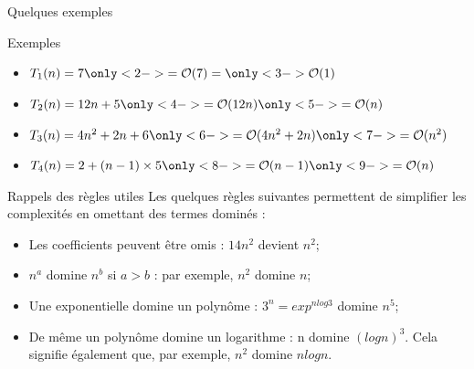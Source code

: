 \documentclass[10pt,xcolor=dvipsnames]{beamer}
\begin{document}
\begin{frame}{Quelques exemples}
    \begin{exampleblock}{Exemples}
\begin{itemize}
    \item $T_1(n) = 7 \only<2->{= \mathcal{O}(7)} = \only<3->{\mathcal{O}(1)}$
    \item $T_2(n) = 12n + 5 \only<4->{= \mathcal{O}(12n)} \only<5->{= \mathcal{O}(n)}$
    \item $T_3(n) = 4n^2 + 2n + 6 \only<6->{= \mathcal{O}(4n^2 + 2n)} \only<7->{= \mathcal{O}(n^2)}$
    \item $T_4(n) = 2 + (n-1) \times 5 \only<8->{= \mathcal{O}(n-1)} \only<9->{= \mathcal{O}(n)}$
\end{itemize}
\end{exampleblock}


\end{frame}

\begin{frame}{Rappels des règles utiles}
Les quelques règles suivantes permettent de simplifier les complexités en omettant des termes dominés :
\begin{itemize}
    \item Les \alert{coefficients peuvent être omis} : $14n^2$ devient $n^2$;
    \item $n^a$ domine $n^b$ si $a > b$ : par exemple, $n^2$ domine $n$;
    \item Une exponentielle domine un polynôme : $3^n=exp^{nlog 3}$ domine $n^5$;
    \item De même un polynôme domine un logarithme : n domine $(log n)^3$. Cela signifie également que, par exemple, $n^2$ domine $n log n$.
\end{itemize}
\end{frame}
\end{document}
